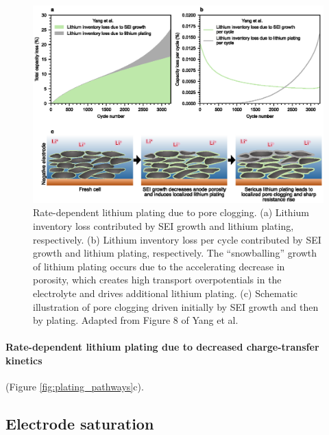 \documentclass[journal=jpclcd,manuscript=article]{achemso}
\begin{document}
\begin{figure}[hp]
    \centering
    \includegraphics[scale=1]{figures/yang_remade.eps}
    \caption{Rate-dependent lithium plating due to pore clogging. (a) Lithium inventory loss contributed by SEI growth and lithium plating, respectively. (b) Lithium inventory loss per cycle contributed by SEI growth and lithium plating, respectively. The ``snowballing'' growth of lithium plating occurs due to the accelerating decrease in porosity, which creates high transport overpotentials in the electrolyte and drives additional lithium plating. (c) Schematic illustration of pore clogging driven initially by SEI growth and then by plating. Adapted from Figure 8 of Yang et al.\cite{yang_modeling_2017}}
    \label{fig:pore_clogging}
\end{figure}

\paragraph{Rate-dependent lithium plating due to decreased charge-transfer kinetics}
 (Figure \ref{fig:plating_pathways}c).

\subsection{Electrode saturation}
\end{document}
